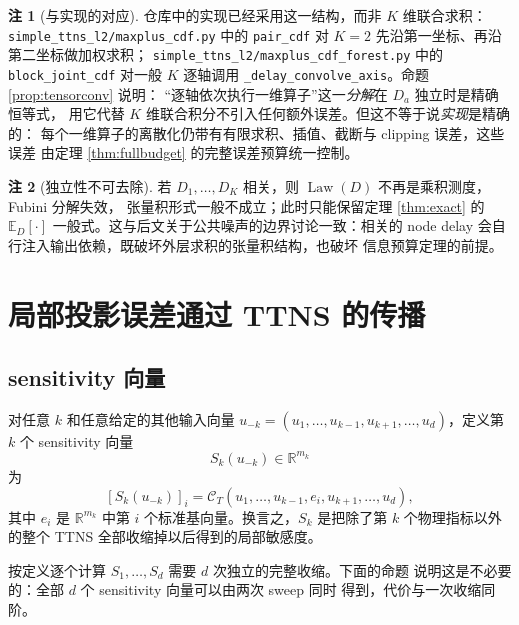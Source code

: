 \documentclass[a4paper,11pt]{article}
\theoremstyle{definition}
\newtheorem{remark}{注}
\newcommand{\R}{\mathbb R}
\newcommand{\E}{\mathbb E}
\newcommand{\1}{\mathbf 1}
\newcommand{\Law}{\operatorname{Law}}
\begin{document}
\begin{remark}[与实现的对应]
\label{rem:implconv}
\sloppy
仓库中的实现已经采用这一结构，而非 $K$ 维联合求积：
\texttt{simple\_ttns\_l2/}\allowbreak\texttt{maxplus\_cdf.py}
中的 \texttt{pair\_cdf} 对 $K=2$ 先沿第一坐标、再沿第二坐标做加权求积；
\texttt{simple\_ttns\_l2/}\allowbreak\texttt{maxplus\_cdf\_forest.py}
中的 \texttt{block\_joint\_cdf} 对一般 $K$ 逐轴调用
\texttt{\_delay\_convolve\_axis}。命题 \ref{prop:tensorconv} 说明：
“逐轴依次执行一维算子”这一\emph{分解}在 $D_a$ 独立时是精确恒等式，
用它代替 $K$ 维联合积分不引入任何额外误差。但这不等于说\emph{实现}是精确的：
每个一维算子的离散化仍带有有限求积、插值、截断与 clipping 误差，这些误差
由定理 \ref{thm:fullbudget} 的完整误差预算统一控制。
\end{remark}

\begin{remark}[独立性不可去除]
若 $D_1,\ldots,D_K$ 相关，则 $\Law(D)$ 不再是乘积测度，Fubini 分解失效，
张量积形式一般不成立；此时只能保留定理 \ref{thm:exact} 的
$\E_D[\cdot]$ 一般式。这与后文关于公共噪声的边界讨论一致：相关的
node delay 会自行注入输出依赖，既破坏外层求积的张量积结构，也破坏
信息预算定理的前提。
\end{remark}

\section{局部投影误差通过 TTNS 的传播}

\subsection{sensitivity 向量}

对任意 $k$ 和任意给定的其他输入向量 $u_{-k}=(u_1,\ldots,u_{k-1},u_{k+1},
\ldots,u_d)$，定义第 $k$ 个 sensitivity 向量
\[
S_k(u_{-k})\in\R^{m_k}
\]
为
\[
[S_k(u_{-k})]_i
=
\mathcal C_T(u_1,\ldots,u_{k-1},e_i,u_{k+1},\ldots,u_d),
\]
其中 $e_i$ 是 $\R^{m_k}$ 中第 $i$ 个标准基向量。换言之，$S_k$ 是把除了第
$k$ 个物理指标以外的整个 TTNS 全部收缩掉以后得到的局部敏感度。

按定义逐个计算 $S_1,\ldots,S_d$ 需要 $d$ 次独立的完整收缩。下面的命题
说明这是不必要的：全部 $d$ 个 sensitivity 向量可以由两次 sweep 同时
得到，代价与一次收缩同阶。
\end{document}
